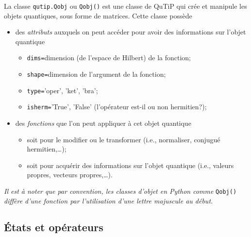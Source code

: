 La classe \texttt{qutip.Qobj} ou \texttt{Qobj()} est une classe de QuTiP qui 
crée et manipule les objets quantiques, sous forme de matrices. Cette classe 
possède 
\begin{itemize}
 \item des \emph{attributs} auxquels on peut accéder pour avoir des 
informations sur l'objet quantique 
\begin{itemize}
\item \texttt{dims=}dimension (de l'espace de Hilbert) de la fonction; 

\item \texttt{shape=}dimension de l'argument de la fonction;
 
\item \texttt{type=}'oper', 'ket', 'bra'; 

\item \texttt{isherm=}'True', 'False' (l'opérateur est-il ou non hermitien?);   
\end{itemize}

\item des \emph{fonctions} que l'on peut appliquer à cet objet quantique  
\begin{itemize}

\item soit pour le modifier ou le transformer (i.e., normaliser, conjugué 
hermitien,\ldots);

\item soit pour acquérir des informations sur l'objet quantique (i.e., valeurs 
propres, vecteurs propres,\ldots).                                  
\end{itemize}

\end{itemize}

\emph{Il est à noter que par convention, les classes d'objet en Python comme} 
\texttt{Qobj()} \emph{diffère d'une fonction par l'utilisation d'une lettre 
majuscule au début.}

\subsection{États et opérateurs}

